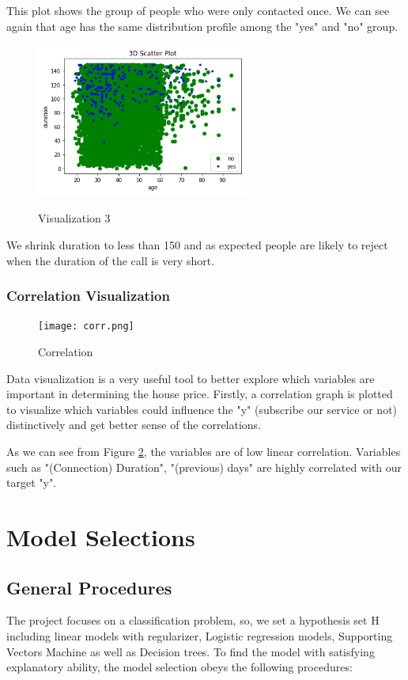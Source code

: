 \documentclass{mytemplate}%
\begin{document}
\begin{multicols}{2}
This plot shows the group of people who were only contacted once. We can see again that age has the same distribution profile among the "yes" and "no" group.
\begin{figure}[H]
  \centering
  \includegraphics[width=7cm]{age_dur_scat_shrt.PNG}\\
  \caption{Visualization 3}\label{g03}
\end{figure}

We shrink duration to less than 150 and as expected people are likely to reject when the duration of the call is very short.
\subsubsection{Correlation Visualization}
\begin{figure}[H]
  \centering
  \texttt{[image: corr.png]}\\
  \caption{Correlation}\label{g04}
\end{figure}

Data visualization is a very useful tool to better
explore which variables are important in
determining the house price. Firstly, a correlation graph is plotted
to visualize which variables could influence the "y" (subscribe our service or not) distinctively and get better sense of the correlations.

As we can see from Figure \ref{g04}, the variables are of low linear correlation. Variables such as "(Connection) Duration", "(previous) days" are highly correlated with our target "y".

\section{\color{blue}Model Selections}
\subsection{General Procedures}
The project focuses on a classification problem, so, we set a hypothesis set H including linear models with regularizer, Logistic regression models, Supporting Vectors Machine as well as Decision trees. To find the model with satisfying explanatory ability, the model selection obeys the following procedures:


\end{multicols}
\end{document}
